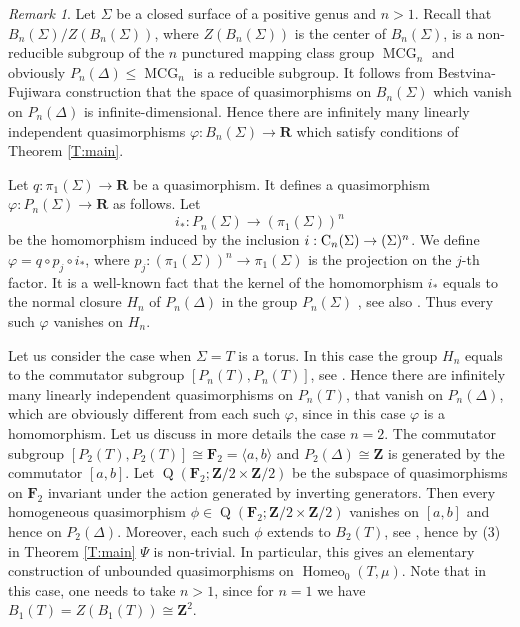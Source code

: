 \documentclass[11pt]{amsart}
\theoremstyle{definition}
\theoremstyle{remark}
\newtheorem{remark}[subsection]{Remark}
\numberwithin{equation}{section}
\numberwithin{figure}{section}
\newcommand{\B}[1]{{\mathbf #1}}
\newcommand{\OP}{\operatorname}
\begin{document}
\begin{remark}\label{R:existence_of_psi}
Let $\Sigma$ be a closed surface of a positive genus and $n>1$. Recall that $B_n(\Sigma)/Z(B_n(\Sigma))$,
where $Z(B_n(\Sigma))$ is the center of $B_n(\Sigma)$, is a non-reducible subgroup  
of the $n$ punctured mapping class group $\operatorname{MCG}_n$ 
\cite[Corollary 7.13]{MR1195787} and obviously $P_n(\Delta)\leq \operatorname{MCG}_n$
is a reducible subgroup. It follows from Bestvina-Fujiwara construction \cite[Theorem 12]{zbMATH01928904} 
that the space of quasimorphisms on $B_n(\Sigma)$ 
which vanish on $P_n(\Delta)$ is infinite-dimensional. 
Hence there are infinitely many linearly independent quasimorphisms 
$\varphi\colon B_n(\Sigma)\to \B R$ which satisfy conditions of Theorem \ref{T:main}.

Let $q:\pi_1(\Sigma)\to\B R$ be a quasimorphism. It defines 
a quasimorphism $\varphi:P_n(\Sigma)\to\B R$ as follows. Let 
$$i_*:P_n(\Sigma)\to(\pi_1(\Sigma))^n$$
be the homomorphism induced by the inclusion $i: {\rm C}_n(\Sigma)\to(\Sigma)^n$. 
We define $\varphi=q\circ p_j\circ i_*$, where 
$p_j:(\pi_1(\Sigma))^n\to \pi_1(\Sigma)$ is the projection on the $j$-th factor.
It is a well-known fact that the kernel of the homomorphism $i_*$ equals to 
the normal closure $H_n$ of $P_n(\Delta)$ in the group $P_n(\Sigma)$ \cite[Theorem 1]{MR334182}, see also \cite{MR234447}.
Thus every such $\varphi$ vanishes on $H_n$. 

Let us consider the case when $\Sigma=T$ is a torus. 
In this case the group $H_n$ equals to the commutator subgroup $[P_n(T),P_n(T)]$, see \cite{MR234447}. 
Hence there are infinitely  many linearly independent quasimorphisms on $P_n(T)$, that vanish 
on $P_n(\Delta)$, which are obviously different from each such $\varphi$, since in this case 
$\varphi$ is a homomorphism. Let us discuss in more details the case $n=2$. 
The commutator subgroup $[P_2(T),P_2(T)]\cong \B F_2=\langle a,b \rangle$ and 
$P_2(\Delta)\cong\B Z$ is generated by the commutator $[a,b]$. Let 
$\operatorname{Q}(\B F_2;\B Z/2\times \B Z/2)$ be the subspace of quasimorphisms 
on $\B F_2$ invariant under the action generated by inverting generators.
Then every homogeneous quasimorphism $\phi\in\operatorname{Q}(\B F_2;\B Z/2\times \B Z/2)$ vanishes on $[a,b]$
and hence on $P_2(\Delta)$. Moreover, each such $\phi$ extends to $B_2(T)$, 
see \cite[Proposition 2.8]{zbMATH06814502}, hence by (3) in Theorem \ref{T:main} $\Psi$ is non-trivial. 
In particular, this gives an elementary construction of 
unbounded quasimorphisms on $\OP{Homeo}_0(T,\mu)$. 
Note that in this case, one needs to take $n>1$, since for $n=1$ we have $B_1(T) = Z(B_1(T))\cong\B Z^2$.


\end{remark}
\end{document}
